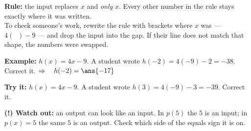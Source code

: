 \documentclass[12pt]{article}
\begin{document}

\begin{formulabox}
\textbf{Rule:} the input replaces $x$ and \textit{only} $x$. Every other number in the rule stays
exactly where it was written.\\[3pt]
To check someone's work, rewrite the rule with brackets where $x$ was --- $4(\;\;) - 9$ --- and
drop the input into the gap. If their line does not match that shape, the numbers were swapped.
\end{formulabox}

\begin{examplebox}
\textbf{Example:} \quad $h(x) = 4x - 9$. A student wrote $h(-2) = 4(-9) - 2 = -38$. Correct it.
$\Rightarrow\quad h(-2) = \ans{-17}$
\end{examplebox}

\begin{tryitbox}
\textbf{Try it:} \quad $h(x) = 4x - 9$. A student wrote $h(3) = 4(-9) - 3 = -39$. Correct it.\\[2pt]
\end{tryitbox}

\begin{watchoutbox}
\textbf{(!) Watch out:} an output can look like an input. In $p(5)$ the $5$ is an input; in
$p(x) = 5$ the same $5$ is an output. Check which side of the equals sign it is on.
\end{watchoutbox}
\end{document}
